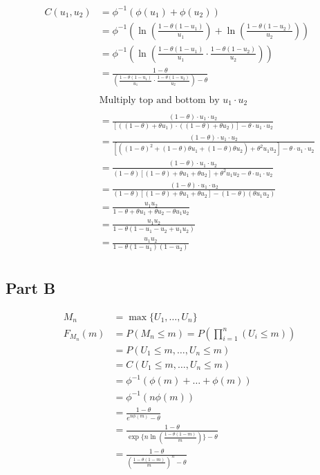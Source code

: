 \documentclass[
  oneside]{book}
\begin{document}
\[
\begin{aligned}
C(u_{1}, u_{2}) &= \phi ^{-1}(\phi(u_{1})+\phi(u_{2}))\\
&= \phi ^{-1} \left( \ln \left( \frac{1-\theta(1-u_{1})}{u_{1}} \right) + \ln \left( \frac{1-\theta(1-u_{2})}{u_{2}} \right) \right)\\
&= \phi ^{-1}\left( \ln \left( \frac{1-\theta(1-u_{1})}{u_{1}} \cdot \frac{1-\theta(1-u_{2})}{u_{2}} \right) \right)\\
&= \frac{1-\theta}{\left( \frac{1-\theta(1-u_{1})}{u_{1}} \cdot \frac{1-\theta(1-u_{2})}{u_{2}} \right)-\theta}\\
\\
&\text{Multiply top and bottom by } u_{1}\cdot u_{2}\\
\\
&= \frac{(1-\theta)\cdot u_{1}\cdot u_{2}}{\left[ ((1-\theta) + \theta u_{1}) \cdot ((1-\theta) + \theta u_{2}) \right]-\theta\cdot u_{1}\cdot u_{2}}\\
&= \frac{(1-\theta)\cdot u_{1}\cdot u_{2}}
{\left[((1-\theta)^{2} + (1-\theta)\theta u_{1} + (1-\theta)\theta u_{2}) + \theta^{2} u_{1}u_{2} \right]
-\theta\cdot u_{1}\cdot u_{2}}\\
&= \frac{(1-\theta)\cdot u_{1}\cdot u_{2}}
{(1-\theta)\left[(1-\theta) + \theta u_{1} + \theta u_{2} \right] + \theta^{2} u_{1}u_{2}
-\theta\cdot u_{1}\cdot u_{2}}\\
&= \frac{(1-\theta)\cdot u_{1}\cdot u_{2}}
{(1-\theta)\left[(1-\theta) + \theta u_{1} + \theta u_{2} \right]- (1-\theta)(\theta u_{1} u_{2})}\\
&= \frac{u_{1}u_{2}}
{1-\theta + \theta u_{1} + \theta u_{2} - \theta u_{1} u_{2}}\\
&= \frac{u_{1}u_{2}}
{1-\theta(1 - u_{1} - u_{2} + u_{1} u_{2})}\\
&= \frac{u_{1}u_{2}}
{1-\theta(1 - u_{1})(1-u_{2})}\\
\end{aligned}
\]

\hypertarget{part-b-4}{%
\subsection{Part B}\label{part-b-4}}

\[
\begin{aligned}
M_{n} &= \max\{U_{1},\dots,U_{n}\}\\
F_{M_{n}}(m) &= P(M_{n} \leq m) = P\left( \prod^{n}_{i=1} (U_{i} \leq m) \right)\\
&= P(U_{1}\leq m, \dots, U_{n}\leq m)\\
&= C(U_{1}\leq m, \dots, U_{n}\leq m)\\
&= \phi ^{-1}(\phi(m)+\dots +\phi(m))\\
&= \phi ^{-1}(n\phi(m))\\
&= \frac{1-\theta}{e^{n\phi(m)}-\theta}\\
&= \frac{1-\theta}{\exp\{n\ln \left( \frac{1-\theta(1-m)}{m} \right)\}-\theta}\\
&= \frac{1-\theta}{\left( \frac{1-\theta(1-m)}{m} \right)^{n}-\theta}\\
\end{aligned}
\]
\end{document}

